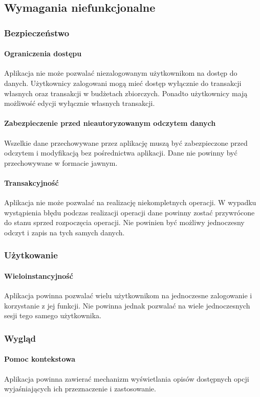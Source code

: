 \newpage
\subsection{Wymagania niefunkcjonalne}
\subsubsection{Bezpieczeństwo}

\paragraph{Ograniczenia dostępu\newline}
Aplikacja nie może pozwalać niezalogowanym użytkownikom na dostęp do danych. Użytkownicy zalogowani mogą mieć dostęp wyłącznie do transakcji własnych oraz transakcji w budżetach zbiorczych. Ponadto użytkownicy mają możliwość edycji wyłącznie własnych transakcji.

\paragraph{Zabezpieczenie przed nieautoryzowanym odczytem danych\newline}
Wszelkie dane przechowywane przez aplikację muszą być zabezpieczone przed odczytem i modyfikacją bez pośrednictwa aplikacji. Dane nie powinny być przechowywane w formacie jawnym.

\paragraph{Transakcyjność\newline}
Aplikacja nie może pozwalać na realizację niekompletnych operacji. W wypadku wystąpienia błędu podczas realizacji operacji dane powinny zostać przywrócone do stanu sprzed rozpoczęcia operacji. Nie powinien być możliwy jednoczesny odczyt i zapis na tych samych danych.

\subsubsection{Użytkowanie}

\paragraph{Wieloinstancyjność\newline}
Aplikacja powinna pozwalać wielu użytkownikom na jednoczesne zalogowanie i korzystanie z jej funkcji. Nie powinna jednak pozwalać na wiele jednoczesnych sesji tego samego użytkownika.

\subsubsection{Wygląd}

\paragraph{Pomoc kontekstowa\newline}
Aplikacja powinna zawierać mechanizm wyświetlania opisów dostępnych opcji wyjaśniających ich przeznaczenie i zastosowanie.